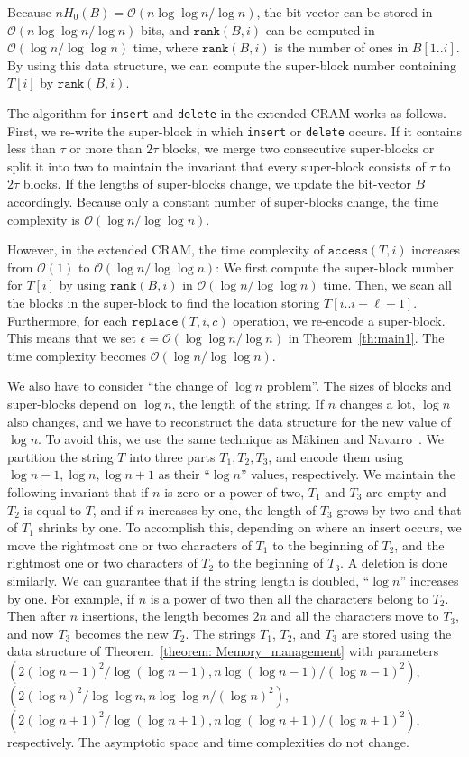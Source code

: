 \documentclass{llncs}
\newcommand{\Order}{\mathcal{O}}
\begin{document}
Because $nH_0(B) = \Order(n\log\log n/\log n)$, the bit-vector can be stored
in $\Order(n\log\log n/\log n)$ bits,
and $\texttt{rank}(B,i)$ can be computed in $\Order(\log n/\log \log n)$ time,
where $\texttt{rank}(B,i)$ is the number of ones in $B[1..i]$.
By using this data structure, we can compute the super-block number containing $T[i]$ by $\texttt{rank}(B,i)$.

The algorithm for \texttt{insert} and \texttt{delete} in
the extended CRAM works as follows.
First, we re-write the super-block in which \texttt{insert} or \texttt{delete} occurs.
If it contains less than $\tau$ or more than $2\tau$ blocks, we merge two consecutive super-blocks
or split it into two to maintain the invariant that every super-block consists of $\tau$ to $2\tau$ blocks.  If the lengths of super-blocks change, we update the bit-vector $B$ accordingly.
Because only a constant number of super-blocks change, the time complexity is 
$\Order(\log n/\log \log n)$.

However, in the extended CRAM, the time complexity of $\texttt{access}(T,i)$
increases from $\Order(1)$ to $\Order(\log n/\log \log n)$:
We first compute the super-block number for $T[i]$ by using
$\texttt{rank}(B,i)$ in $\Order(\log n/\log \log n)$ time.
Then, we scan all the blocks in the super-block
to find the location storing $T[i..i+\ell-1]$.
Furthermore, for each $\texttt{replace}(T,i,c)$ operation, we re-encode
a super-block.
This means that we set $\epsilon = \Order(\log\log n/\log n)$ in Theorem~\ref{th:main1}.
The time complexity becomes $\Order(\log n/\log \log n)$.

We also have to consider ``the change of $\log n$ problem''.
The sizes of blocks and super-blocks
depend on $\log n$, the length of the string.  If $n$ changes a lot, $\log n$ also changes, and
we have to reconstruct the data structure for the new value of $\log n$.  To avoid this,
we use the same technique as M{\"a}kinen and Navarro~\cite{MNtalg08}.  We partition the string $T$ into three parts
$T_1, T_2, T_3$, and encode them using $\log n -1, \log n, \log n+1$ as their ``$\log n$'' values,
respectively.  
We maintain the following invariant that
if $n$ is zero or a power of two, $T_1$ and $T_3$ are empty and $T_2$ is
equal to $T$, and
if $n$ increases by one, the length of $T_3$ grows by two and that of $T_1$
shrinks by one.  To accomplish this,
depending on where an insert occurs, we move the rightmost one or two characters
of $T_1$ to the beginning of $T_2$, and the rightmost one or two characters of $T_2$ to the beginning of $T_3$.
A deletion is done similarly.
We can guarantee that if the string length is doubled,
``$\log n$'' increases by one.
For example, if $n$ is a power of two then all the characters belong to $T_2$.
Then after $n$ insertions, the length becomes $2n$ and
all the characters move to $T_3$, and now $T_3$ becomes the new $T_2$.
The strings $T_1$, $T_2$, and $T_3$ are stored using
the data structure of Theorem~\ref{theorem: Memory_management} with parameters
$(2(\log n-1)^2/\log(\log n-1), n\log(\log n-1)/(\log n-1)^2)$,
$(2(\log n)^2/\log\log n, n\log\log n/(\log n)^2)$,
$(2(\log n+1)^2/\log(\log n+1), n\log(\log n+1)/(\log n+1)^2)$,
respectively.
The asymptotic space and time complexities do not change.
\end{document}

